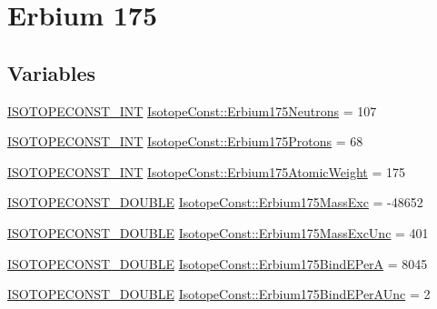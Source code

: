 \hypertarget{group___isotope_const-_erbium-_er175}{}\section{Erbium 175}
\label{group___isotope_const-_erbium-_er175}
\subsection*{Variables}
\begin{DoxyCompactItemize}
\item 
\mbox{\hyperlink{group___isotope_const-_macros_ga5f18360b3e99483a35c32d789e62621c}{I\+S\+O\+T\+O\+P\+E\+C\+O\+N\+S\+T\+\_\+\+I\+NT}} \mbox{\hyperlink{group___isotope_const-_erbium-_er175_ga723e24a4c4ee143a0a4ebf9f2ae7b71a}{Isotope\+Const\+::\+Erbium175\+Neutrons}} = 107
\item 
\mbox{\hyperlink{group___isotope_const-_macros_ga5f18360b3e99483a35c32d789e62621c}{I\+S\+O\+T\+O\+P\+E\+C\+O\+N\+S\+T\+\_\+\+I\+NT}} \mbox{\hyperlink{group___isotope_const-_erbium-_er175_gacf998f1d1225546ac9952cd80f1a1c90}{Isotope\+Const\+::\+Erbium175\+Protons}} = 68
\item 
\mbox{\hyperlink{group___isotope_const-_macros_ga5f18360b3e99483a35c32d789e62621c}{I\+S\+O\+T\+O\+P\+E\+C\+O\+N\+S\+T\+\_\+\+I\+NT}} \mbox{\hyperlink{group___isotope_const-_erbium-_er175_gac2b441a43bb12840b02bb4b09ecb2288}{Isotope\+Const\+::\+Erbium175\+Atomic\+Weight}} = 175
\item 
\mbox{\hyperlink{group___isotope_const-_macros_ga8f45a7272ce02c0b4c65c44636ed719a}{I\+S\+O\+T\+O\+P\+E\+C\+O\+N\+S\+T\+\_\+\+D\+O\+U\+B\+LE}} \mbox{\hyperlink{group___isotope_const-_erbium-_er175_gac6be8acc455e86e8fa58de1db69c3488}{Isotope\+Const\+::\+Erbium175\+Mass\+Exc}} = -\/48652
\item 
\mbox{\hyperlink{group___isotope_const-_macros_ga8f45a7272ce02c0b4c65c44636ed719a}{I\+S\+O\+T\+O\+P\+E\+C\+O\+N\+S\+T\+\_\+\+D\+O\+U\+B\+LE}} \mbox{\hyperlink{group___isotope_const-_erbium-_er175_ga1c05c0dc3bef4207f08003fefc9ef4d4}{Isotope\+Const\+::\+Erbium175\+Mass\+Exc\+Unc}} = 401
\item 
\mbox{\hyperlink{group___isotope_const-_macros_ga8f45a7272ce02c0b4c65c44636ed719a}{I\+S\+O\+T\+O\+P\+E\+C\+O\+N\+S\+T\+\_\+\+D\+O\+U\+B\+LE}} \mbox{\hyperlink{group___isotope_const-_erbium-_er175_ga9433668ccd6791bb0b0371c188914f29}{Isotope\+Const\+::\+Erbium175\+Bind\+E\+PerA}} = 8045
\item 
\mbox{\hyperlink{group___isotope_const-_macros_ga8f45a7272ce02c0b4c65c44636ed719a}{I\+S\+O\+T\+O\+P\+E\+C\+O\+N\+S\+T\+\_\+\+D\+O\+U\+B\+LE}} \mbox{\hyperlink{group___isotope_const-_erbium-_er175_ga30551790caf85812faefc3997f49655b}{Isotope\+Const\+::\+Erbium175\+Bind\+E\+Per\+A\+Unc}} = 2

\end{DoxyCompactItemize}
